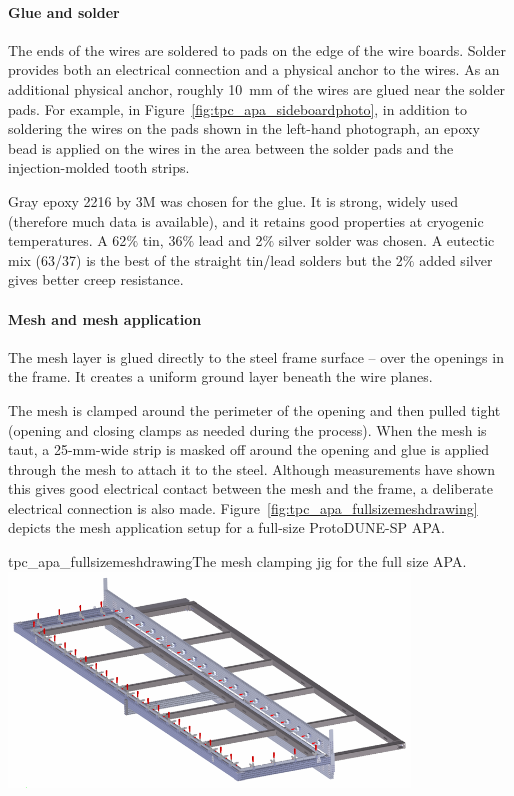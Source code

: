 \paragraph{Glue and solder}
The ends of the wires are soldered to pads on the edge of the wire boards.  Solder provides both an electrical connection and a physical anchor to the wires.  As an additional physical anchor, roughly 10~mm of the wires are glued near the solder pads.  For example, in Figure~\ref{fig:tpc_apa_sideboardphoto}, in addition to soldering the wires on the pads shown in the left-hand photograph, an epoxy bead is applied on the wires in the area between the solder pads and the injection-molded tooth strips.

Gray epoxy 2216 by 3M was chosen for the glue.  It is strong, widely used (therefore much data is available), and it retains good properties at cryogenic temperatures.  A 62$\%$ tin, 36$\%$ lead and 2$\%$ silver solder was chosen.  A eutectic mix (63/37) is the best of the straight tin/lead solders but the 2$\%$ added silver gives better creep resistance.


\paragraph{Mesh and mesh application}

The mesh layer is glued directly to the steel frame surface -- over the openings in the frame.  It creates a uniform ground layer beneath the wire planes.  

The mesh is clamped around the perimeter of the opening and then pulled tight (opening and closing clamps as needed during the process).  When the mesh is taut, a 25-mm-wide strip is masked off around the opening and glue is applied through the mesh to attach it to the steel.  Although measurements have shown this gives good electrical contact between the mesh and the frame, a deliberate electrical connection is also made.  Figure~\ref{fig:tpc_apa_fullsizemeshdrawing} depicts the mesh application setup for a full-size ProtoDUNE-SP APA.

\begin{cdrfigure}{tpc_apa_fullsizemeshdrawing}{The mesh clamping jig for the full size APA.}
\includegraphics[width=0.8\textwidth]{figures/tpc_apa_fullsizemeshdrawing.png} 
\end{cdrfigure}


